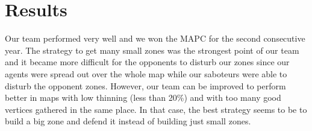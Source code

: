 \section{Results} %

Our team performed very well and we won the MAPC for the second consecutive year. The strategy to get many small zones was the strongest point of our team and it became more difficult for the opponents to disturb our zones since our agents were spread out over the whole map while our saboteurs were able to disturb the opponent zones. However, our team can be improved to perform better in maps with low thinning (less than 20\%) and with too many good vertices gathered in the same place. In that case, the best strategy seems to be to build a big zone and defend it instead of building just small zones.

